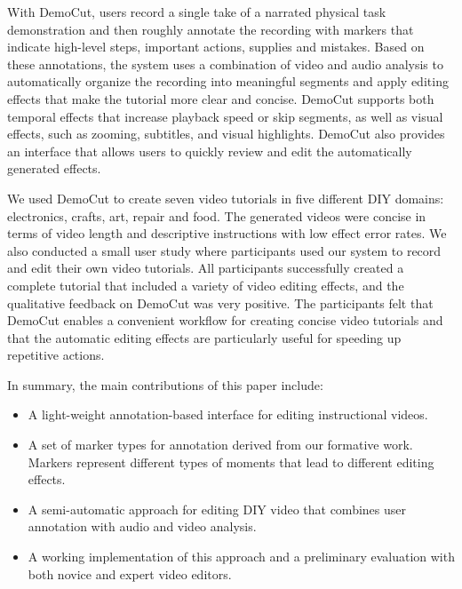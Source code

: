 With DemoCut, users record a single take of a narrated physical
task demonstration and then roughly annotate the recording with
markers that indicate high-level steps, important actions, supplies
and mistakes.
%
Based on these annotations, the system uses a combination of video and
audio analysis to automatically organize the recording into meaningful
segments and apply editing effects that make the tutorial more clear
and concise.
%
DemoCut supports both temporal effects that increase playback
speed or skip segments, as well as visual effects, such as
zooming, subtitles, and visual highlights.
%
DemoCut also provides an interface that allows users to quickly review
and edit the automatically generated effects.

We used DemoCut to create seven video tutorials in five
different DIY domains: electronics, crafts, art, repair and food.
The generated videos were concise in terms of video length and descriptive instructions with low effect error rates.
%
We also conducted a small user study where participants used
our system to record and edit their own video tutorials.
%
All participants successfully created a complete tutorial that
included a variety of video editing effects, and the qualitative
feedback on DemoCut was very positive.
%
The participants felt that DemoCut enables a convenient workflow for
creating concise video tutorials and that the automatic editing
effects are particularly useful for speeding up repetitive
actions.

In summary, the main contributions of this paper include:

\begin{itemize}
  \setlength{\itemsep}{0pt}
\item A light-weight annotation-based interface for editing instructional videos.
\item A set of marker types for annotation derived from our formative work. Markers represent different types of moments that lead to different editing effects.
\item A semi-automatic approach for editing DIY video that
  combines user annotation with audio and video analysis.
\item A working implementation of this approach and a preliminary evaluation with both novice and expert video editors.
\end{itemize}
